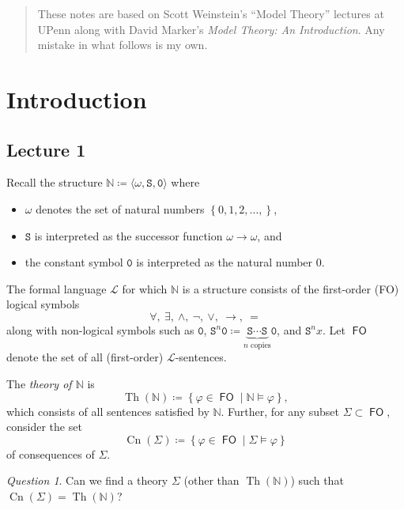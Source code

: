 \documentclass[10pt,letterpaper,cm]{nupset}
\theoremstyle{definition}
\theoremstyle{theorem}
\theoremstyle{remark}
\newtheorem*{question}{Question}
\newcommand{\N}{\mathbb N}
\renewcommand{\S}{\mathtt S}
\newcommand{\1}{\mathbf{1}}
\newcommand{\0}{\mathsf 0}
\DeclareMathOperator{\fo}{\mathsf{FO}}
\DeclareMathOperator{\thh}{Th}
\DeclareMathOperator{\cn}{Cn}
\begin{document}
\thispagestyle{empty}
\begin{abstract}
These notes are based on Scott Weinstein's ``Model Theory'' lectures at UPenn along with David Marker's \textit{Model Theory: An Introduction}. Any mistake in what follows is my own.
\end{abstract}

\tableofcontents
\newpage

\section{Introduction}
\subsection{Lecture 1}

Recall the structure $\N \coloneqq \langle \omega, \S, \mathtt{0}\rangle$ where 
\begin{itemize}
\item $\omega$ denotes the set of natural numbers $\left\{0,1,2,\ldots,\right\}$, 
\item $\S$ is interpreted as the successor function $\omega \to \omega$, and 
\item the constant symbol $\mathtt{0}$ is interpreted as the natural number $0$.
\end{itemize}

The formal language $\mathcal{L}$ for which $\N$ is a structure consists of the first-order (FO) logical symbols
\[
\forall, \ \exists, \ \land,\ \neg,\ \vee,\ \rightarrow, \ =
\]
along with non-logical symbols such as $\mathtt{0}$, $\S^n{\mathtt{0}}\coloneqq \underbrace{\S\cdots \S}_{n\text{ copies}}{\mathtt{0}}$, and $\S^n{x}$. Let $\fo$ denote the set of all (first-order) $\mathcal{L}$-sentences. 

\smallskip

The \textit{theory of $\N$} is 
\[
\thh(\N) \coloneqq \left\{\varphi \in \fo \mid \N \models \varphi \right\},
\] which consists of all sentences satisfied by $\N$. Further, for any subset $\Sigma \subset \fo$, consider the set $$\cn(\Sigma)  \coloneqq \left\{\varphi \in \fo \mid \Sigma \models \varphi\right\}$$ of consequences of $\Sigma$.

\begin{question}
Can we find a theory $\Sigma$ (other than $\thh(\N)$) such that $\cn(\Sigma) = \thh(\N)$?
\end{question}
\end{document}
